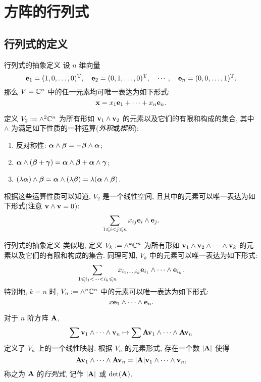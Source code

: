\section{方阵的行列式}

\subsection{行列式的定义}

\begin{frame}{行列式的抽象定义\noexer}
	\onslide<+->
	设 $n$ 维向量
	\[{\mathbf{e}}_1=(1,0,\dots,0)^{\mathrm{T}},\quad
	{\mathbf{e}}_2=(0,1,\dots,0)^{\mathrm{T}},\quad\cdots,\quad
	{\mathbf{e}}_n=(0,0,\dots,1)^{\mathrm{T}}.\]
	\onslide<+->
	那么 $V={\mathbb{C}}^n$ 中的任一元素均可唯一表达为如下形式:
	\[{\mathbf{x}}=x_1{\mathbf{e}}_1+\cdots+x_n{\mathbf{e}}_n.\]

	\onslide<+->
	定义 $V_2:=\wedge^2{\mathbb{C}}^n$ 为所有形如 ${\mathbf{v}}_1\wedge{\mathbf{v}}_2$ 的元素以及它们的有限和构成的集合,
	\onslide<+->
	其中 $\wedge$ 为满足如下性质的一种运算(\emph{外积}或\emph{楔积}):
	\begin{enumerate}
		\item 反对称性: ${\boldsymbol{\alpha}}\wedge {\boldsymbol{\beta}}=-{\boldsymbol{\beta}}\wedge{\boldsymbol{\alpha}}$;
		\item ${\boldsymbol{\alpha}}\wedge({\boldsymbol{\beta}}+{\boldsymbol{\gamma}})={\boldsymbol{\alpha}}\wedge{\boldsymbol{\beta}}+{\boldsymbol{\alpha}}\wedge{\boldsymbol{\gamma}}$;
		\item $(\lambda{\boldsymbol{\alpha}})\wedge{\boldsymbol{\beta}}={\boldsymbol{\alpha}}\wedge(\lambda{\boldsymbol{\beta}})=\lambda({\boldsymbol{\alpha}}\wedge{\boldsymbol{\beta}})$.
	\end{enumerate}
	\onslide<+->
	根据这些运算性质可以知道, $V_2$ 是一个线性空间,
	\onslide<+->
	且其中的元素可以唯一表达为如下形式(注意 ${\mathbf{v}}\wedge{\mathbf{v}}=0$):
	\[\sum_{1\leqslant i<j\leqslant n} x_{ij} {\mathbf{e}}_i\wedge{\mathbf{e}}_j.\]
\end{frame}


\begin{frame}{行列式的抽象定义\noexer}
	\onslide<+->
	类似地, 定义 $V_k:=\wedge^k{\mathbb{C}}^n$ 为所有形如 ${\mathbf{v}}_1\wedge{\mathbf{v}}_2\wedge\cdots\wedge{\mathbf{v}}_k$ 的元素以及它们的有限和构成的集合.
	\onslide<+->
	同理可知, $V_k$ 中的元素可以唯一表达为如下形式:
	\[\sum_{1\leqslant i_1<\cdots<i_k\leqslant n} x_{i_1,\dots,i_k} {\mathbf{e}}_{i_1}\wedge\cdots\wedge{\mathbf{e}}_{i_k}.\]
	\onslide<+->
	特别地, $k=n$ 时, $V_n:=\wedge^n{\mathbb{C}}^n$ 中的元素可以唯一表达为如下形式:
	\[x{\mathbf{e}}_1\wedge\cdots\wedge{\mathbf{e}}_n.\]

	\onslide<+->
	对于 $n$ 阶方阵 ${\mathbf{A}}$,
	\[\sum{\mathbf{v}}_1\wedge\dots\wedge {\mathbf{v}}_n\mapsto \sum{\mathbf{A}}{\mathbf{v}}_1\wedge \dots\wedge {\mathbf{A}}{\mathbf{v}}_n\]
	定义了 $V_n$ 上的一个线性映射.
	\onslide<+->
	根据 $V_n$ 的元素形式, 存在一个数 $|{\mathbf{A}}|$ 使得
	\[{\mathbf{A}}{\mathbf{v}}_1\wedge \dots\wedge {\mathbf{A}}{\mathbf{v}}_n=|{\mathbf{A}}| {\mathbf{v}}_1\wedge\dots\wedge {\mathbf{v}}_n,\]
	\onslide<+->
	称之为 ${\mathbf{A}}$ 的\emph{行列式}, 记作 $|{\mathbf{A}}|$ 或 $\det({\mathbf{A}})$.
\end{frame}


